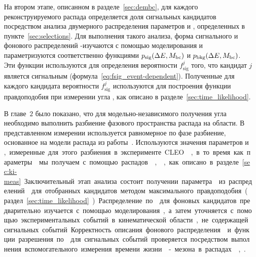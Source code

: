 На втором этапе, описанном в разделе~\ref{sec:dembc}, для каждого реконструируемого распада определяется доля сигнальных кандидатов посредством анализа двумерного распределения параметров \de и \mbc, определенных в пункте~\ref{sec:selections}.  Для выполнения такого анализа, форма сигнального и фонового распределений \de-\mbc изучаются с помощью моделирования и параметризуются соответственно функциями $p{}_{\mathrm{sig}}(\Delta E,M_{\mathrm{bc}})$ и $p{}_{\mathrm{bkg}}(\Delta E,M_{\mathrm{bc}})$.  Эти функции используются для определения вероятности $f_{\mathrm{sig}}^j$ того, что кандидат $j$ является сигнальным (формула~\eqref{eq:fsig_event-dependent}).  Полученные для каждого кандидата вероятности $f_{\mathrm{sig}}^j$ используются для построения функции правдоподобия при измерении угла \pphi, как описано в разделе~\ref{sec:time_likelihood}.

В главе~$2$ было показано, что для модельно-независимого получения угла \pphi необходимо выполнить разбиение фазового пространства распада \dnkpp на области.  В представленном измерении используется равномерное по фазе разбиение, основанное на модели распада из работы~\cite{belle_gamma_dalitz_model}.  Используются значения параметров \ci и \si, измеренные для этого разбиения в эксперименте CLEO~\cite{CLEO_phases}, в то время как параметры \ki мы получаем с помощью распадов \bpdpi, \dbkpp, как описано в разделе~\ref{sec:ki-meas}.

Заключительный этап анализа состоит получении параметра \pphi из распределений \dt для отобранных кандидатов методом максимального правдоподобия (раздел~\ref{sec:time_likelihood}).  Распределение по \dt для фоновых кандидатов предварительно изучается с помощью моделирования, а затем уточняется с помощью экспериментальных событий в кинематической области, не содержащей сигнальных событий.  Корректность описания фонового распределения \dt и функции разрешения по \dt для сигнальных событий проверяется посредством выполнения вспомогательного измерения времени жизни \bn-мезона в распадах \bdsth, \dbkpp. 

